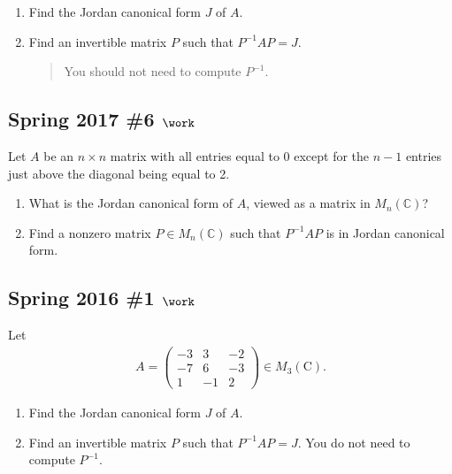 \begin{enumerate}
\def\labelenumi{\alph{enumi}.}
\item
  Find the Jordan canonical form \(J\) of \(A\).
\item
  Find an invertible matrix \(P\) such that \(P^{-1}AP = J\).

  \begin{quote}
  You should not need to compute \(P^{-1}\).
  \end{quote}
\end{enumerate}

\hypertarget{spring-2017-6-work}{%
\subsection{\texorpdfstring{Spring 2017 \#6
\(\work\)}{Spring 2017 \#6 \textbackslash work}}\label{spring-2017-6-work}}

Let \(A\) be an \(n\times n\) matrix with all entries equal to \(0\)
except for the \(n-1\) entries just above the diagonal being equal to 2.

\begin{enumerate}
\def\labelenumi{\alph{enumi}.}
\item
  What is the Jordan canonical form of \(A\), viewed as a matrix in
  \(M_n({\mathbb{C}})\)?
\item
  Find a nonzero matrix \(P\in M_n({\mathbb{C}})\) such that
  \(P^{-1}A P\) is in Jordan canonical form.
\end{enumerate}

\hypertarget{spring-2016-1-work}{%
\subsection{\texorpdfstring{Spring 2016 \#1
\(\work\)}{Spring 2016 \#1 \textbackslash work}}\label{spring-2016-1-work}}

Let
\begin{align*}
A=\left(\begin{array}{ccc}
-3 & 3 & -2 \\
-7 & 6 & -3 \\
1 & -1 & 2
\end{array}\right) \in M_{3}(\mathrm{C})
.\end{align*}

\begin{enumerate}
\def\labelenumi{\alph{enumi}.}
\item
  Find the Jordan canonical form \(J\) of \(A\).
\item
  Find an invertible matrix \(P\) such that \(P^{-1}A P = J\). You do
  not need to compute \(P^{-1}\).
\end{enumerate}

